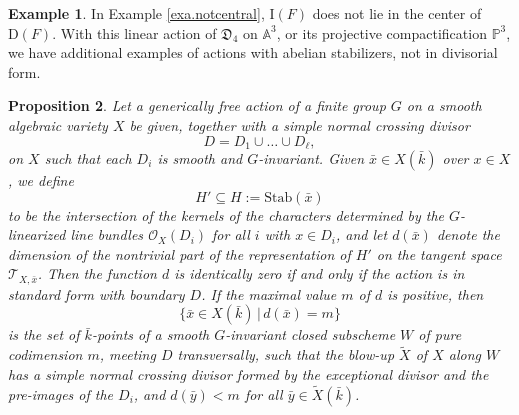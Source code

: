 \documentclass[12pt,reqno]{amsart}
\theoremstyle{plain}
\newtheorem{prop}{Proposition}[section]
\theoremstyle{remark}
\theoremstyle{definition}
\newtheorem{exam}[prop]{Example}
\numberwithin{equation}{section}
\newcommand{\A}{{\mathbb A}}
\newcommand{\bP}{{\mathbb P}}
\newcommand{\cO}{{\mathcal O}}
\newcommand{\cT}{{\mathcal T}}
\begin{document}
\begin{exam}
\label{exa.morenotdivisorial}
In Example \ref{exa.notcentral},
$\mathrm{I}(F)$ does not lie in the center of $\mathrm{D}(F)$.
With this linear action of $\mathfrak{D}_4$ on $\A^3$, or its projective compactification $\bP^3$, we have additional examples of actions with abelian stabilizers, not in divisorial form.
\end{exam}

\begin{prop}
\label{prop.divisorial}
Let a generically free action of a finite group $G$ on a smooth algebraic variety $X$ be given, together with a simple normal crossing divisor
\[ D=D_1\cup\dots\cup D_\ell, \]
on $X$ such that each $D_i$ is smooth and $G$-invariant.
Given $\bar x\in X(\bar k)$ over $x\in X$, we define
\[ H'\subseteq H:=\mathrm{Stab}(\bar x) \]
to be the intersection of the kernels of the characters determined by the $G$-linearized line bundles $\cO_X(D_i)$ for all $i$ with $x\in D_i$, and let $d(\bar x)$ denote the dimension of the nontrivial part of the representation of $H'$ on the tangent space $\cT_{X,\bar x}$.
Then the function $d$ is identically zero if and only if the action is in standard form with boundary $D$.
If the maximal value $m$ of $d$ is positive, then
\[ \{\bar x\in X(\bar k)\,|\, d(\bar x)=m\} \]
is the set of $\bar k$-points of a smooth $G$-invariant closed subscheme $W$ of pure codimension $m$, meeting $D$ transversally, such that the blow-up $\widetilde{X}$ of $X$ along $W$ has a simple normal crossing divisor formed by the exceptional divisor and the pre-images of the $D_i$, and $d(\bar y)<m$ for all $\bar y\in \widetilde{X}(\bar k)$.
\end{prop}
\end{document}
